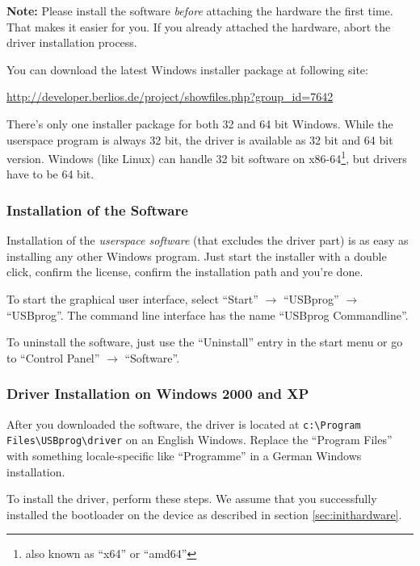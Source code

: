 \documentclass[bibtotoc,UKenglish,halfparskip,oneside,DIV12]{scrreprt}
\begin{document}
\textbf{Note:} Please install the software \emph{before} attaching the hardware the first time. That
makes it easier for you. If you already attached the hardware, abort the driver installation
process.

You can download the latest Windows installer package at following site:

 \url{http://developer.berlios.de/project/showfiles.php?group_id=7642}

There's only one installer package for both 32 and 64 bit Windows. While the userspace program is
always 32 bit, the driver is available as 32 bit and 64 bit version. Windows (like Linux) can handle
32 bit software on x86-64\footnote{also known as ``x64'' or ``amd64''}, but drivers have to be 64
bit.


\subsubsection{Installation of the Software}

Installation of the \emph{userspace software} (that excludes the driver part) is as easy as
installing any other Windows program. Just start the installer with a double click, confirm the
license, confirm the installation path and you're done.

To start the graphical user interface, select ``Start'' $\rightarrow$ ``USBprog''
$\rightarrow$ ``USBprog''. The command line interface has the name ``USBprog Commandline''.

To uninstall the software, just use the ``Uninstall'' entry in the start menu or go to ``Control
Panel'' $\rightarrow$ ``Software''.


\subsubsection{Driver Installation on Windows 2000 and XP}

After you downloaded the software, the driver is located at \texttt{c:\textbackslash{}Program
Files\textbackslash{}USBprog\textbackslash{}driver} on an English Windows. Replace the ``Program
Files'' with something locale-specific like ``Programme'' in a German Windows installation.

To install the driver, perform these steps. We assume that you successfully installed the bootloader
on the device as described in section \vref{sec:inithardware}.
\end{document}
